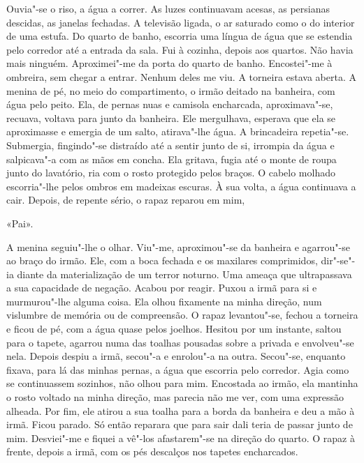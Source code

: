Ouvia"-se o riso, a água a correr. As luzes continuavam acesas, as
persianas descidas, as janelas fechadas. A televisão ligada, o ar saturado
como o do interior de uma estufa. Do quarto de banho, escorria uma
língua de água que se estendia pelo corredor até a entrada da sala. Fui
à cozinha, depois aos quartos. Não havia mais ninguém. Aproximei"-me da
porta do quarto de banho. Encostei"-me à ombreira, sem chegar a entrar.
Nenhum deles me viu. A torneira estava aberta. A menina de pé, no meio
do compartimento, o irmão deitado na banheira, com água pelo peito. Ela,
de pernas nuas e camisola encharcada, aproximava"-se, recuava, voltava
para junto da banheira. Ele mergulhava, esperava que ela se aproximasse
e emergia de um salto, atirava"-lhe água. A brincadeira repetia"-se.
Submergia, fingindo"-se distraído até a sentir junto de si, irrompia da
água e salpicava"-a com as mãos em concha. Ela gritava, fugia até o
monte de roupa junto do lavatório, ria com o rosto protegido pelos
braços. O cabelo molhado escorria"-lhe pelos ombros em madeixas escuras.
À sua volta, a água continuava a cair. Depois, de repente sério, o rapaz
reparou em mim,

«Pai».

A menina seguiu"-lhe o olhar. Viu"-me, aproximou"-se da banheira e
agarrou"-se ao braço do irmão. Ele, com a boca fechada e os maxilares
comprimidos, dir"-se"-ia diante da materialização de um terror noturno.
Uma ameaça que ultrapassava a sua capacidade de negação. Acabou por
reagir. Puxou a irmã para si e murmurou"-lhe alguma coisa. Ela olhou
fixamente na minha direção, num vislumbre de memória ou de compreensão.
O rapaz levantou"-se, fechou a torneira e ficou de pé, com a água quase
pelos joelhos. Hesitou por um instante, saltou para o tapete, agarrou
numa das toalhas pousadas sobre a privada e envolveu"-se nela. Depois
despiu a irmã, secou"-a e enrolou"-a na outra. Secou"-se, enquanto
fixava, para lá das minhas pernas, a água que escorria pelo corredor.
Agia como se continuassem sozinhos, não olhou para mim. Encostada ao
irmão, ela mantinha o rosto voltado na minha direção, mas parecia não
me ver, com uma expressão alheada. Por fim, ele atirou a sua toalha para
a borda da banheira e deu a mão à irmã. Ficou parado. Só então reparara
que para sair dali teria de passar junto de mim. Desviei"-me e fiquei a
vê"-los afastarem"-se na direção do quarto. O rapaz à frente, depois a
irmã, com os pés descalços nos tapetes encharcados.

